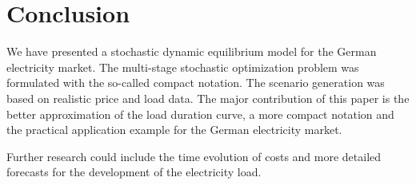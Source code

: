 \clearpage
\section{Conclusion}
\label{sec:conclusion}

We have presented a stochastic dynamic equilibrium model for the German electricity market. The multi-stage stochastic optimization problem was formulated with the so-called compact notation. The scenario generation was based on realistic price and load data. The major contribution of this paper is the better approximation of the load duration curve, a more compact notation and the practical application example for the German electricity market.

Further research could include the time evolution of costs and more detailed forecasts for the development of the electricity load.

